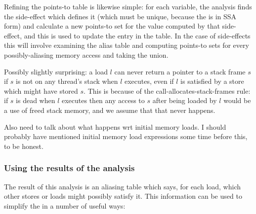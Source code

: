 Refining the points-to table is likewise simple: for each variable,
the analysis finds the side-effect which defines it (which must be
unique, because the {\StateMachine} is in SSA form) and calculate a
new points-to set for the value computed by that side-effect, and this
is used to update the entry in the table.  In the case of 
side-effects this will involve examining the alias table and computing
points-to sets for every possibly-aliasing memory access and taking
the union.

Possibly slightly surprising: a load $l$ can never return a pointer to
a stack frame $s$ if $s$ is not on any thread's stack when $l$
executes, even if $l$ is satisfied by a store which might have stored
$s$.  This is because of the call-allocates-stack-frames rule: if $s$
is dead when $l$ executes then any access to $s$ after being loaded by
$l$ would be a use of freed stack memory, and we assume that that
never happens. 

Also need to talk about what happens wrt initial memory loads.  I
should probably have mentioned initial memory load expressions some
time before this, to be honest.

\subsubsection{Using the results of the analysis}

The result of this analysis is an aliasing table which says, for each
load, which other stores or loads might possibly satisfy it.  This
information can be used to simplify the {\StateMachine} in a number of
useful ways:

